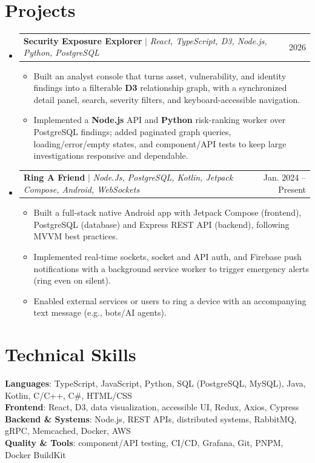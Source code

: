 \documentclass[letterpaper,11pt]{article}
\makeatletter
\newcommand{\resumeItem}[1]{
  \item\small{
    {#1 \vspace{-2pt}}
  }
}
\newcommand{\resumeProjectHeading}[2]{
    \item
    \begin{tabular*}{0.97\textwidth}{l@{\extracolsep{\fill}}r}
      \small#1 & #2 \\
    \end{tabular*}\vspace{-7pt}
}
\newcommand{\resumeSubHeadingListStart}{\begin{itemize}[leftmargin=0.15in, label={}]}
\newcommand{\resumeSubHeadingListEnd}{\end{itemize}}
\newcommand{\resumeItemListStart}{\begin{itemize}}
\newcommand{\resumeItemListEnd}{\end{itemize}\vspace{-5pt}}
\makeatother
\begin{document}
\section{Projects}
\resumeSubHeadingListStart
\resumeProjectHeading
{\textbf{Security Exposure Explorer} $|$ \emph{React, TypeScript, D3, Node.js, Python, PostgreSQL}}{2026}
\resumeItemListStart
\resumeItem{Built an analyst console that turns asset, vulnerability, and identity findings into a filterable \textbf{D3} relationship graph, with a synchronized detail panel, search, severity filters, and keyboard-accessible navigation.}
\resumeItem{Implemented a \textbf{Node.js} API and \textbf{Python} risk-ranking worker over PostgreSQL findings; added paginated graph queries, loading/error/empty states, and component/API tests to keep large investigations responsive and dependable.}
\resumeItemListEnd
\resumeProjectHeading
{\textbf{Ring A Friend} $|$ \emph{Node.Js, PostgreSQL, Kotlin, Jetpack Compose, Android, WebSockets}}{Jan. 2024 -- Present}
\resumeItemListStart
\resumeItem{Built a full-stack native Android app with Jetpack Compose (frontend), PostgreSQL (database) and Express REST API (backend), following MVVM best practices.}
\resumeItem{Implemented real-time sockets, socket and API auth, and Firebase push notifications with a background service worker to trigger emergency alerts (ring even on silent).}
\resumeItem{Enabled external services or users to ring a device with an accompanying text message (e.g., bots/AI agents).}
\resumeItemListEnd
\resumeSubHeadingListEnd



%
\section{Technical Skills}
\begin{itemize}[leftmargin=0.15in, label={}]
  \small{\item{
        \textbf{Languages}{: TypeScript, JavaScript, Python, SQL (PostgreSQL, MySQL), Java, Kotlin, C/C++, C\#, HTML/CSS} \\
        \textbf{Frontend}{: React, D3, data visualization, accessible UI, Redux, Axios, Cypress} \\
        \textbf{Backend \& Systems}{: Node.js, REST APIs, distributed systems, RabbitMQ, gRPC, Memcached, Docker, AWS} \\
        \textbf{Quality \& Tools}{: component/API testing, CI/CD, Grafana, Git, PNPM, Docker BuildKit}
        }}
\end{itemize}


\end{document}
